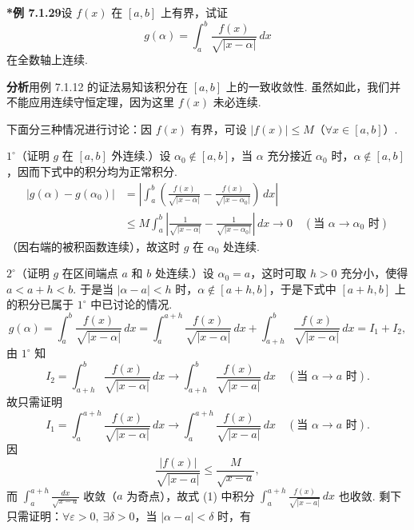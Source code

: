 \documentclass[UTF8, 12pt, fontset=fandol, oneside]{ctexart}
\begin{document}
\noindent\textbf{*例 7.1.29}\quad 设 $f(x)$ 在 $[a,b]$ 上有界，试证
\[
g(\alpha)=\int_a^b\frac{f(x)}{\sqrt{|x-\alpha|}}\,dx
\]
在全数轴上连续.

\noindent\textbf{分析}\quad 用例 7.1.12 的证法易知该积分在 $[a,b]$ 上的一致收敛性. 虽然如此，我们并不能应用连续守恒定理，因为这里 $f(x)$ 未必连续.

下面分三种情况进行讨论：因 $f(x)$ 有界，可设 $|f(x)|\le M$（$\forall x\in[a,b]$）.

$1^\circ$（证明 $g$ 在 $[a,b]$ 外连续.）设 $\alpha_0\notin[a,b]$，当 $\alpha$ 充分接近 $\alpha_0$ 时，$\alpha\notin[a,b]$，因而下式中的积分均为正常积分.
\[
\begin{aligned}
|g(\alpha)-g(\alpha_0)|
&=\left|\int_a^b\left(\frac{f(x)}{\sqrt{|x-\alpha|}}-\frac{f(x)}{\sqrt{|x-\alpha_0|}}\right)\,dx\right|\\
&\le M\int_a^b\left|\frac1{\sqrt{|x-\alpha|}}-\frac1{\sqrt{|x-\alpha_0|}}\right|\,dx\to0
\quad(\text{当 }\alpha\to\alpha_0\text{ 时})
\end{aligned}
\]
（因右端的被积函数连续），故这时 $g$ 在 $\alpha_0$ 处连续.

$2^\circ$（证明 $g$ 在区间端点 $a$ 和 $b$ 处连续.）设 $\alpha_0=a$，这时可取 $h>0$ 充分小，使得 $a<a+h<b$. 于是当 $|\alpha-a|<h$ 时，$\alpha\notin[a+h,b]$，于是下式中 $[a+h,b]$ 上的积分已属于 $1^\circ$ 中已讨论的情况.
\[
g(\alpha)=\int_a^b\frac{f(x)}{\sqrt{|x-\alpha|}}\,dx
=\int_a^{a+h}\frac{f(x)}{\sqrt{|x-\alpha|}}\,dx
+\int_{a+h}^b\frac{f(x)}{\sqrt{|x-\alpha|}}\,dx
=I_1+I_2,
\]
由 $1^\circ$ 知
\[
I_2=\int_{a+h}^b\frac{f(x)}{\sqrt{|x-\alpha|}}\,dx
\to\int_{a+h}^b\frac{f(x)}{\sqrt{|x-a|}}\,dx
\quad(\text{当 }\alpha\to a\text{ 时}).
\]
故只需证明
\begin{equation}
I_1=\int_a^{a+h}\frac{f(x)}{\sqrt{|x-\alpha|}}\,dx
\to\int_a^{a+h}\frac{f(x)}{\sqrt{|x-a|}}\,dx
\quad(\text{当 }\alpha\to a\text{ 时}).
\tag{1}
\end{equation}
因
\[
\frac{|f(x)|}{\sqrt{|x-a|}}\le\frac{M}{\sqrt{x-a}},
\]
而 $\displaystyle\int_a^{a+h}\frac{dx}{\sqrt{x-a}}$ 收敛（$a$ 为奇点），故式 (1) 中积分 $\displaystyle\int_a^{a+h}\frac{f(x)}{\sqrt{|x-a|}}\,dx$ 也收敛. 剩下只需证明：$\forall\varepsilon>0,\ \exists\delta>0$，当 $|\alpha-a|<\delta$ 时，有
\end{document}
